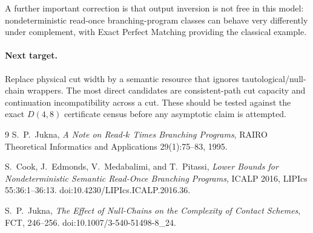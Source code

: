 A further important correction is that output inversion is not free in this model:
nondeterministic read-once branching-program classes can behave very differently under
complement, with Exact Perfect Matching providing the classical example.

\paragraph{Next target.}
Replace physical cut width by a semantic resource that ignores tautological/null-chain
wrappers.  The most direct candidates are consistent-path cut capacity and continuation
incompatibility across a cut.  These should be tested against the exact $D(4,8)$ certificate
census before any asymptotic claim is attempted.

\begin{thebibliography}{9}
S.~P.~Jukna,
\emph{A Note on Read-$k$ Times Branching Programs},
RAIRO Theoretical Informatics and Applications 29(1):75--83, 1995.

S.~Cook, J.~Edmonds, V.~Medabalimi, and T.~Pitassi,
\emph{Lower Bounds for Nondeterministic Semantic Read-Once Branching Programs},
ICALP 2016, LIPIcs 55:36:1--36:13.
doi:10.4230/LIPIcs.ICALP.2016.36.

S.~P.~Jukna,
\emph{The Effect of Null-Chains on the Complexity of Contact Schemes},
FCT, 246--256.
doi:10.1007/3-540-51498-8_24.
\end{thebibliography}

